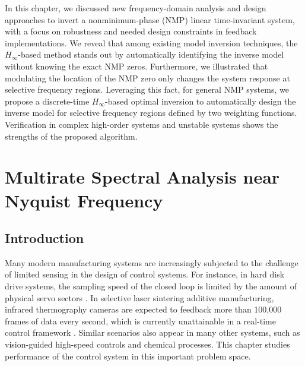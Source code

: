 \documentclass [11pt, proquest] {uwthesis}[2020/02/24]
\begin{document}
In this chapter, we discussed new frequency-domain analysis and design
approaches to invert a nonminimum-phase (NMP) linear time-invariant
system, with a focus on robustness and needed design constraints in
feedback implementations. We reveal that among existing model inversion
techniques, the $H_{\infty}$-based method stands out by automatically
identifying the inverse model without knowing the exact NMP zeros.
Furthermore, we illustrated that modulating the location of the NMP
zero only changes the system response at selective frequency regions.
Leveraging this fact, for general NMP systems, we propose a discrete-time
$H_{\infty}$-based optimal inversion to automatically design the
inverse model for selective frequency regions defined by two weighting
functions. Verification in complex high-order systems and unstable
systems shows the strengths of the proposed algorithm.



\chapter{Multirate Spectral Analysis near Nyquist Frequency} \label{chap:Spectral-Analysis}

\section{Introduction}

Many modern manufacturing systems are increasingly
subjected to the challenge of limited sensing in the design of control
systems. For instance, in hard disk drive systems, the sampling speed
of the closed loop is limited by the amount of physical servo sectors
\cite{6387309,1461412}. In selective laser sintering additive manufacturing,
infrared thermography cameras are expected to feedback more than 100,000
frames of data every second, which is currently unattainable in a
real-time control framework \cite{Berumen:2010hq,frazier2014metal}.
Similar scenarios also appear in many other systems, such as vision-guided
high-speed controls \cite{6605587,6926836} and chemical processes.
This chapter studies performance of the control system in this important
problem space.
\end{document}
